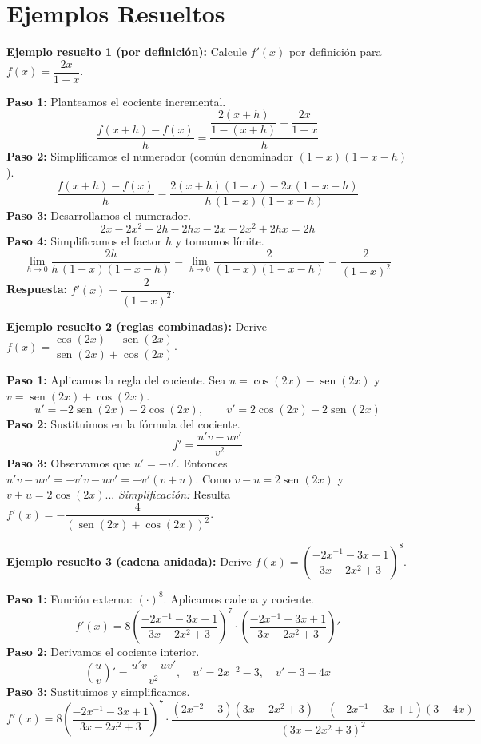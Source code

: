 \documentclass[12pt, letterpaper]{article}
\begin{document}
\newpage
\section{Ejemplos Resueltos}

\noindent\textbf{Ejemplo resuelto 1 (por definición):} Calcule $f'(x)$ por definición para $f(x) = \dfrac{2x}{1-x}$.

\begin{cuadrosolucion}
  \textbf{Paso 1:} Planteamos el cociente incremental.
  \[
    \frac{f(x+h) - f(x)}{h}
    = \frac{\dfrac{2(x+h)}{1-(x+h)} - \dfrac{2x}{1-x}}{h}
  \]
  \textbf{Paso 2:} Simplificamos el numerador (común denominador $(1-x)(1-x-h)$).
  \[
    \frac{f(x+h) - f(x)}{h}
    = \frac{2(x+h)(1-x) - 2x(1-x-h)}{h\,(1-x)(1-x-h)}
  \]
  \textbf{Paso 3:} Desarrollamos el numerador.
  \[
    2x - 2x^2 + 2h - 2hx - 2x + 2x^2 + 2hx = 2h
  \]
  \textbf{Paso 4:} Simplificamos el factor $h$ y tomamos límite.
  \[
    \lim_{h\to0} \frac{2h}{h\,(1-x)(1-x-h)} = \lim_{h\to0} \frac{2}{(1-x)(1-x-h)} = \frac{2}{(1-x)^2}
  \]
  \textbf{Respuesta:} $f'(x) = \dfrac{2}{(1-x)^2}$.
\end{cuadrosolucion}

\noindent\textbf{Ejemplo resuelto 2 (reglas combinadas):} Derive $f(x) = \dfrac{\cos(2x)-\operatorname{sen}(2x)}{\operatorname{sen}(2x)+\cos(2x)}$.

\begin{cuadrosolucion}
  \textbf{Paso 1:} Aplicamos la regla del cociente. Sea $u = \cos(2x)-\operatorname{sen}(2x)$ y $v = \operatorname{sen}(2x)+\cos(2x)$.
  \[
    u' = -2\operatorname{sen}(2x) - 2\cos(2x), \qquad
    v' = 2\cos(2x) - 2\operatorname{sen}(2x)
  \]
  \textbf{Paso 2:} Sustituimos en la fórmula del cociente.
  \[
    f' = \frac{u'v - uv'}{v^2}
  \]
  \textbf{Paso 3:} Observamos que $u' = -v'$. Entonces $u'v - uv' = -v'v - uv' = -v'(v+u)$. Como $v - u = 2\operatorname{sen}(2x)$ y $v + u = 2\cos(2x)$...
  \noindent\textit{Simplificación:} Resulta $f'(x) = -\dfrac{4}{( \operatorname{sen}(2x)+\cos(2x) )^2}$.
\end{cuadrosolucion}

\noindent\textbf{Ejemplo resuelto 3 (cadena anidada):} Derive $f(x) = \left(\dfrac{-2x^{-1} - 3x + 1}{3x - 2x^2 + 3}\right)^{8}$.

\begin{cuadrosolucion}
  \textbf{Paso 1:} Función externa: $(\cdot)^8$. Aplicamos cadena y cociente.
  \[
    f'(x) = 8\left(\frac{-2x^{-1} - 3x + 1}{3x - 2x^2 + 3}\right)^{7}
    \cdot \left(\frac{-2x^{-1} - 3x + 1}{3x - 2x^2 + 3}\right)'
  \]
  \textbf{Paso 2:} Derivamos el cociente interior.
  \[
    \left(\frac{u}{v}\right)' = \frac{u'v - uv'}{v^2},
    \quad u' = 2x^{-2} - 3,\quad v' = 3 - 4x
  \]
  \textbf{Paso 3:} Sustituimos y simplificamos.
  \[
    f'(x) = 8\left(\frac{-2x^{-1} - 3x + 1}{3x - 2x^2 + 3}\right)^{7}
    \cdot \frac{(2x^{-2} - 3)(3x-2x^2+3) - (-2x^{-1}-3x+1)(3-4x)}{(3x-2x^2+3)^2}
  \]
\end{cuadrosolucion}
\end{document}
